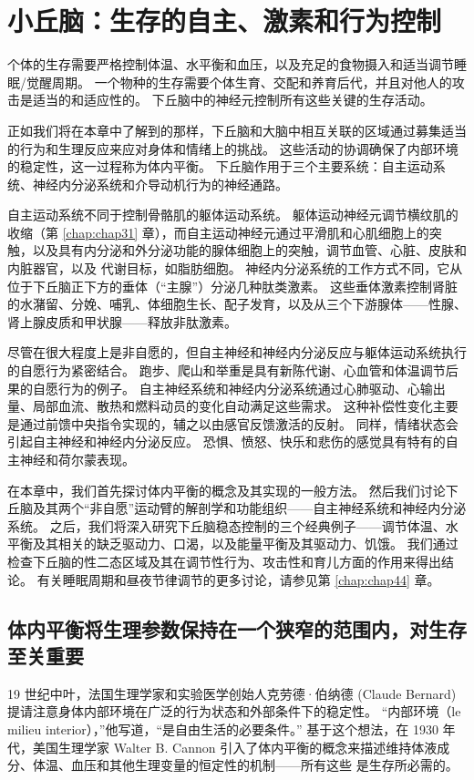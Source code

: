 \chapter{小丘脑：生存的自主、激素和行为控制} \label{chap:chap41}
个体的生存需要严格控制体温、水平衡和血压，以及充足的食物摄入和适当调节睡眠/觉醒周期。 一个物种的生存需要个体生育、交配和养育后代，并且对他人的攻击是适当的和适应性的。 下丘脑中的神经元控制所有这些关键的生存活动。

正如我们将在本章中了解到的那样，下丘脑和大脑中相互关联的区域通过募集适当的行为和生理反应来应对身体和情绪上的挑战。 这些活动的协调确保了内部环境的稳定性，这一过程称为体内平衡。 下丘脑作用于三个主要系统：自主运动系统、神经内分泌系统和介导动机行为的神经通路。

自主运动系统不同于控制骨骼肌的躯体运动系统。 躯体运动神经元调节横纹肌的收缩（第 \ref{chap:chap31} 章），而自主运动神经元通过平滑肌和心肌细胞上的突触，以及具有内分泌和外分泌功能的腺体细胞上的突触，调节血管、心脏、皮肤和内脏器官，以及 代谢目标，如脂肪细胞。 神经内分泌系统的工作方式不同，它从位于下丘脑正下方的垂体（“主腺”）分泌几种肽类激素。 这些垂体激素控制肾脏的水潴留、分娩、哺乳、体细胞生长、配子发育，以及从三个下游腺体——性腺、肾上腺皮质和甲状腺——释放非肽激素。

尽管在很大程度上是非自愿的，但自主神经和神经内分泌反应与躯体运动系统执行的自愿行为紧密结合。 跑步、爬山和举重是具有新陈代谢、心血管和体温调节后果的自愿行为的例子。 自主神经系统和神经内分泌系统通过心肺驱动、心输出量、局部血流、散热和燃料动员的变化自动满足这些需求。 这种补偿性变化主要是通过前馈中央指令实现的，辅之以由感官反馈激活的反射。 同样，情绪状态会引起自主神经和神经内分泌反应。 恐惧、愤怒、快乐和悲伤的感觉具有特有的自主神经和荷尔蒙表现。

在本章中，我们首先探讨体内平衡的概念及其实现的一般方法。 然后我们讨论下丘脑及其两个“非自愿”运动臂的解剖学和功能组织——自主神经系统和神经内分泌系统。 之后，我们将深入研究下丘脑稳态控制的三个经典例子——调节体温、水平衡及其相关的缺乏驱动力、口渴，以及能量平衡及其驱动力、饥饿。 我们通过检查下丘脑的性二态区域及其在调节性行为、攻击性和育儿方面的作用来得出结论。 有关睡眠周期和昼夜节律调节的更多讨论，请参见第 \ref{chap:chap44} 章。

\section{体内平衡将生理参数保持在一个狭窄的范围内，对生存至关重要}

19 世纪中叶，法国生理学家和实验医学创始人克劳德·伯纳德 (Claude Bernard) 提请注意身体内部环境在广泛的行为状态和外部条件下的稳定性。 “内部环境（le milieu interior），”他写道，“是自由生活的必要条件。” 基于这个想法，在 1930 年代，美国生理学家 Walter B. Cannon 引入了体内平衡的概念来描述维持体液成分、体温、血压和其他生理变量的恒定性的机制——所有这些 是生存所必需的。

